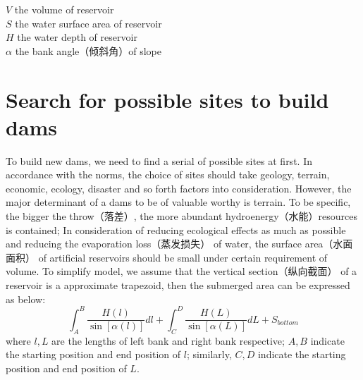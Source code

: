 \documentclass{article}
\begin{document}


$V$ the volume of reservoir \\
$S$ the water surface area of reservoir \\
$H$ the water depth of reservoir \\
$\alpha$ the bank angle（倾斜角）of slope


\section{Search for possible sites to build dams}
To build new dams, we need to find a serial of possible sites at first. In accordance with the norms, the choice of sites should take geology, terrain, economic, ecology, disaster and so forth factors into consideration. However, the major determinant of a dams to be of valuable worthy is terrain. To be specific, the bigger the throw（落差）, the more abundant hydroenergy（水能）resources is contained; In consideration of reducing ecological effects as much as possible and reducing the evaporation loss（蒸发损失） of water, the surface area（水面面积） of artificial reservoirs should be small under certain requirement of volume. To simplify model, we assume that the vertical section（纵向截面） of a reservoir is a approximate trapezoid, then the submerged area can be expressed as below:
\begin{equation}\int_{A}^{B}\frac{H\left(l\right)}{\sin\left[\alpha\left(l\right)\right]}dl + \int_{C}^{D}\frac{H\left(L\right)}{\sin\left[\alpha\left(L\right)\right]}dL + S_{bottom}\end{equation}
where $l, L$ are the lengths of left bank and right bank respective; $A, B$ indicate the starting position and end position of $l$; similarly, $C, D$ indicate the starting position and end position of $L$.



\end{document}
